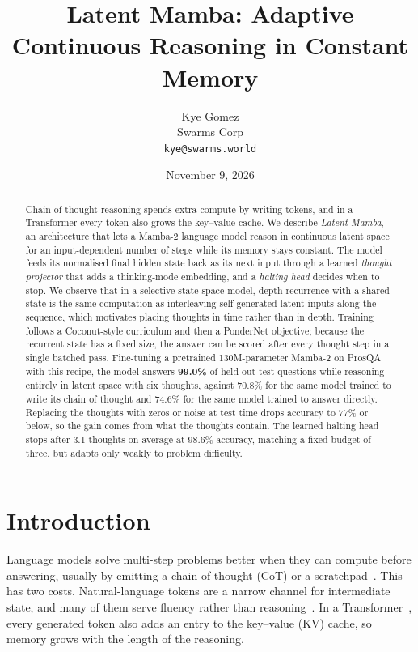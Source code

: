 \documentclass[10pt]{article}
\title{\textbf{Latent Mamba: Adaptive Continuous Reasoning in Constant Memory}}
\author{Kye Gomez\\Swarms Corp\\\texttt{kye@swarms.world}}
\date{November 9, 2026}
\begin{document}
\maketitle

\begin{abstract}
Chain-of-thought reasoning spends extra compute by writing tokens, and in a Transformer every token also grows the key--value cache. We describe \emph{Latent Mamba}, an architecture that lets a Mamba-2 language model reason in continuous latent space for an input-dependent number of steps while its memory stays constant. The model feeds its normalised final hidden state back as its next input through a learned \emph{thought projector} that adds a thinking-mode embedding, and a \emph{halting head} decides when to stop. We observe that in a selective state-space model, depth recurrence with a shared state is the same computation as interleaving self-generated latent inputs along the sequence, which motivates placing thoughts in time rather than in depth. Training follows a Coconut-style curriculum and then a PonderNet objective; because the recurrent state has a fixed size, the answer can be scored after every thought step in a single batched pass. Fine-tuning a pretrained 130M-parameter Mamba-2 on ProsQA with this recipe, the model answers \textbf{99.0\%} of held-out test questions while reasoning entirely in latent space with six thoughts, against 70.8\% for the same model trained to write its chain of thought and 74.6\% for the same model trained to answer directly. Replacing the thoughts with zeros or noise at test time drops accuracy to 77\% or below, so the gain comes from what the thoughts contain. The learned halting head stops after 3.1 thoughts on average at 98.6\% accuracy, matching a fixed budget of three, but adapts only weakly to problem difficulty.
\end{abstract}

\section{Introduction}

Language models solve multi-step problems better when they can compute before answering, usually by emitting a chain of thought (CoT) or a scratchpad~\cite{wei2022cot,nye2021scratchpad,kojima2022zeroshot}. This has two costs. Natural-language tokens are a narrow channel for intermediate state, and many of them serve fluency rather than reasoning~\cite{hao2024coconut}. In a Transformer~\cite{vaswani2017attention}, every generated token also adds an entry to the key--value (KV) cache, so memory grows with the length of the reasoning.
\end{document}
